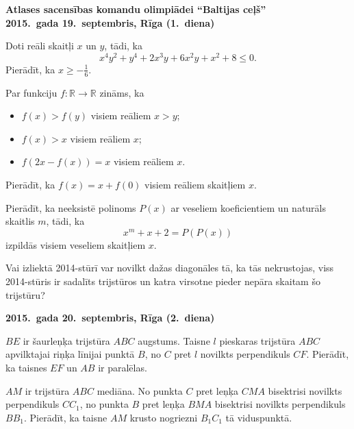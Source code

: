 \documentclass[11pt]{article}
\begin{document}
\begin{center}
{\Large \bf Atlases sacensības komandu olimpiādei ``Baltijas ceļš''}\\
{\bf 2015.\ gada 19.\ septembris, Rīga (1.\ diena)}
\end{center}


\begin{problem}[BW.TST.2015.1]
Doti reāli skaitļi $x$ un $y$, tādi, ka
\[ x^4y^2 + y^4 + 2x^3y + 6x^2y + x^2 + 8 \leq 0. \]
Pierādīt, ka $x \geq -\frac{1}{6}$. 
\end{problem}

\begin{problem}[BW.TST.2015.2]
Par funkciju $f: \mathbb{R} \rightarrow \mathbb{R}$ zināms, ka 
\begin{itemize}
\item $f(x) > f(y)$ visiem reāliem $x > y$; 
\item $f(x) > x$ visiem reāliem $x$; 
\item $f(2x - f(x)) = x$ visiem reāliem $x$. 
\end{itemize}
Pierādīt, ka $f(x) = x + f(0)$ visiem reāliem skaitļiem $x$. 
\end{problem}

\begin{problem}[BW.TST.2015.3]
Pierādīt, ka neeksistē polinoms $P(x)$ ar veseliem koeficientiem un naturāls skaitlis $m$, tādi, ka 
\[ x^m + x + 2 = P(P(x)) \]
izpildās visiem veseliem skaitļiem $x$. 
\end{problem}

\begin{problem}[BW.TST.2015.4]
Vai izliektā 2014-stūrī var novilkt dažas diagonāles tā, ka tās nekrustojas, 
viss 2014-stūris ir sadalīts trijstūros un katra virsotne pieder nepāra skaitam šo trijstūru?
\end{problem}

\begin{center}
{\bf 2015.\ gada 20.\ septembris, Rīga (2.\ diena)}
\end{center}

\begin{problem}[BW.TST.2015.5]
$BE$ ir šaurleņķa trijstūra $ABC$ augstums. Taisne $l$ pieskaras trijstūra $ABC$ apvilktajai 
riņķa līnijai punktā $B$, no $C$ pret $l$ novilkts perpendikuls $CF$. Pierādīt, ka 
taisnes $EF$ un $AB$ ir paralēlas. 
\end{problem}

\begin{problem}[BW.TST.2015.6]
$AM$ ir trijstūra $ABC$ mediāna. No punkta $C$ pret leņķa $CMA$ bisektrisi novilkts perpendikuls $CC_1$, 
no punkta $B$ pret leņķa $BMA$ bisektrisi novilkts perpendikuls $BB_1$. Pierādīt, ka taisne 
$AM$ krusto nogriezni $B_1C_1$ tā viduspunktā. 
\end{problem}
\end{document}
